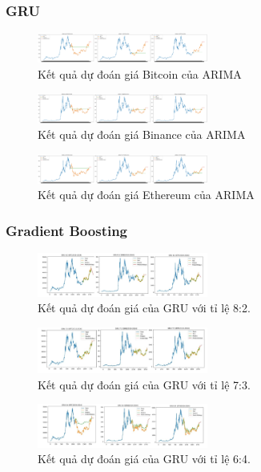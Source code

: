 \documentclass[conference]{IEEEtran}
\begin{document}
\subsubsection{GRU}
\begin{figure}[H]
    \centering
    \includegraphics[width=0.5\textwidth]{bibliography/Figure/ARIMA_BTC_90.png}
    \caption{Kết quả dự đoán giá Bitcoin của ARIMA}
\end{figure}
\begin{figure}[H]
    \centering
    \includegraphics[width=0.5\textwidth]{bibliography/Figure/ARIMA_BNB_90.png}
    \caption{Kết quả dự đoán giá Binance của ARIMA}
\end{figure}
\begin{figure}[H]
    \centering
    \includegraphics[width=0.5\textwidth]{bibliography/Figure/ARIMA_ETH_90.png}
    \caption{Kết quả dự đoán giá Ethereum của ARIMA}
\end{figure}




\subsubsection{Gradient Boosting}

\begin{figure}[H]
    \centering
    \includegraphics[width=0.5\textwidth]{bibliography/pictures/GRU_82.jpg}
    \caption{Kết quả dự đoán giá của GRU với tỉ lệ 8:2.}
\end{figure}
\begin{figure}[H]
    \centering
    \includegraphics[width=0.5\textwidth]{bibliography/pictures/GRU_73.jpg}
    \caption{Kết quả dự đoán giá của GRU với tỉ lệ 7:3.}
\end{figure}
\begin{figure}[H]
    \centering
    \includegraphics[width=0.5\textwidth]{bibliography/pictures/GRU_64.jpg}
    \caption{Kết quả dự đoán giá của GRU với tỉ lệ 6:4.}
\end{figure}
\end{document}

